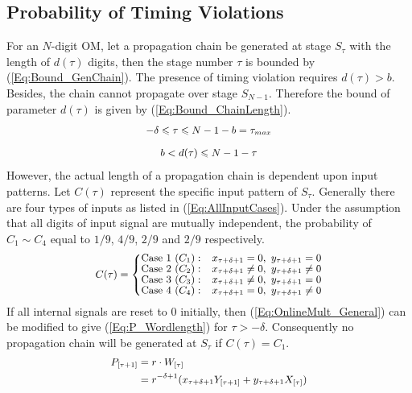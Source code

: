 \documentclass{acm_proc_article-sp}
\begin{document}
\subsection{Probability of Timing Violations}
For an $N$-digit OM, let a propagation chain be generated at stage $S_{\tau}$ with the length of $d(\tau)$ digits, then the stage number $\tau$ is bounded by (\ref{Eq:Bound_GenChain}). The presence of timing violation requires $d(\tau)>b$. Besides, the chain cannot propagate over stage $S_{N-1}$. Therefore the bound of parameter $d(\tau)$ is given by (\ref{Eq:Bound_ChainLength}).
%
\begin{eqnarray}\label{Eq:Bound_GenChain}
\tiny
  -\delta\leqslant\tau\leqslant N-1-b=\tau_{max}
\end{eqnarray}
%
\vspace{-5ex}
\begin{eqnarray}\label{Eq:Bound_ChainLength}
  b<d(\tau)\leqslant N-1-\tau
\normalsize
\end{eqnarray}
%
However, the actual length of a propagation chain is dependent upon input patterns. Let $C(\tau)$ represent the specific input pattern of $S_{\tau}$. Generally there are four types of inputs as listed in (\ref{Eq:AllInputCases}). Under the assumption that all digits of input signal are mutually independent, the probability of $C_1\sim C_4$ equal to $1/9$, $4/9$, $2/9$ and $2/9$ respectively.
%
\begin{eqnarray}\label{Eq:AllInputCases}
\footnotesize
  C(\tau)=\left\{\begin{matrix}
    \text{Case 1~(}C_1{):} & x_{\tau+\delta+1}=0,~y_{\tau+\delta+1}=0\\
    \text{Case 2~(}C_2{):} & x_{\tau+\delta+1}\neq0,~y_{\tau+\delta+1}\neq0\\
    \text{Case 3~(}C_3{):} & x_{\tau+\delta+1}\neq0,~y_{\tau+\delta+1}=0\\
    \text{Case 4~(}C_4{):} & x_{\tau+\delta+1}=0,~y_{\tau+\delta+1}\neq0
  \end{matrix}\right.
\normalsize
\end{eqnarray}
%
If all internal signals are reset to 0 initially, then (\ref{Eq:OnlineMult_General}) can be modified to give (\ref{Eq:P_Wordlength}) for $\tau>-\delta$. Consequently no propagation chain will be generated at $S_{\tau}$ if $C(\tau)=C_1$.
%
\begin{eqnarray}\label{Eq:P_Wordlength}
\footnotesize
  \begin{aligned}
    P_{[\tau+1]} &= r\cdot W_{[\tau]}\\
                 &= r^{-\delta+1}(x_{\tau+\delta+1}Y_{[\tau+1]}+y_{\tau+\delta+1}X_{[\tau]})\\
  \end{aligned}
\normalsize
\end{eqnarray}
\end{document}
